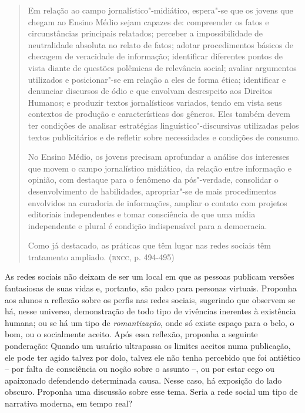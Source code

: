 \documentclass[12pt]{extarticle}
\begin{document}
\begin{quote}
Em relação ao campo jornalístico"-midiático, espera"-se que os jovens
que chegam ao Ensino Médio sejam capazes de: compreender os fatos e
circunstâncias principais relatados; perceber a impossibilidade de
neutralidade absoluta no relato de fatos; adotar procedimentos básicos
de checagem de veracidade de informação; identificar diferentes pontos
de vista diante de questões polêmicas de relevância social; avaliar
argumentos utilizados e posicionar"-se em relação a eles de forma ética;
identificar e denunciar discursos de ódio e que envolvam desrespeito aos
Direitos Humanos; e produzir textos jornalísticos variados, tendo em
vista seus contextos de produção e características dos gêneros. Eles
também devem ter condições de analisar estratégias
linguístico"-discursivas utilizadas pelos textos publicitários e de
refletir sobre necessidades e condições de consumo.

No Ensino Médio, os jovens precisam aprofundar a análise dos interesses
que movem o campo jornalístico midiático, da relação entre informação e
opinião, com destaque para o fenômeno da pós"-verdade, consolidar o
desenvolvimento de habilidades, apropriar"-se de mais procedimentos
envolvidos na curadoria de informações, ampliar o contato com projetos
editoriais independentes e tomar consciência de que uma mídia
independente e plural é condição indispensável para a democracia.

Como já destacado, as práticas que têm lugar nas redes sociais têm
tratamento ampliado. (\textsc{bncc}, p. 494-495)
\end{quote}

As redes sociais não deixam de ser um local em que as pessoas publicam
versões fantasiosas de suas vidas e, portanto, são palco para personas
virtuais. Proponha aos alunos a reflexão sobre os perfis nas redes
sociais, sugerindo que observem se há, nesse universo, demonstração de
todo tipo de vivências inerentes à existência humana; ou se há um tipo
de \emph{romantização}, onde só existe espaço para o belo, o bom, ou o
socialmente aceito. Após essa reflexão, proponha a seguinte
ponderação: Quando um usuário ultrapassa os limites aceitos numa
publicação, ele pode ter agido talvez por dolo, talvez ele não tenha
percebido que foi antiético -- por falta de consciência ou noção sobre
o assunto --, ou por estar cego ou apaixonado defendendo determinada
causa. Nesse caso, há exposição do lado obscuro. Proponha uma
discussão sobre esse tema. Seria a rede social um tipo de narrativa
moderna, em tempo real?
\end{document}
